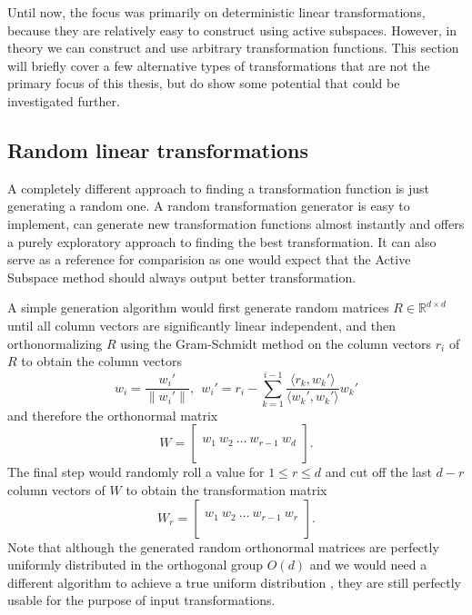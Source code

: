 \documentclass[
  a4paper,  %
  twoside,  %
  bibliography=totoc,
  headsepline,
  cleardoublepage=empty,
  parskip=half,
  draft=false
]{scrbook}
\begin{document}
Until now, the focus was primarily on deterministic linear transformations, because they are relatively easy to construct using active subspaces.
However, in theory we can construct and use arbitrary transformation functions.
This section will briefly cover a few alternative types of transformations that are not the primary focus of this thesis, but do show some potential that could be investigated further.

\subsection{Random linear transformations}
\label{sec:rt}

A completely different approach to finding a transformation function is just generating a random one.
A random transformation generator is easy to implement, can generate new transformation functions almost instantly and offers a purely exploratory approach to finding the best transformation.
It can also serve as a reference for comparision as one would expect that the Active Subspace method should always output better transformation.

A simple generation algorithm would first generate random matrices $R \in \mathds{R}^{d \times d}$ until all column vectors are significantly linear independent, and then orthonormalizing $R$ using the Gram-Schmidt method on the column vectors $r_i$ of $R$ to obtain the column vectors
\begin{equation}
w_i=\frac{w_i'}{\| w_i' \|},~~ w_i'=r_i - \sum_{k=1}^{i-1} \frac{\langle r_k,  w_k' \rangle}{\langle w_k', w_k' \rangle} w_k'
\end{equation}
and therefore the orthonormal matrix
\begin{equation}
W = \begin{bmatrix}
  \\
    w_1 ~ w_2 ~ \dots ~ w_{r-1} ~ w_d\\
    \\
  \end{bmatrix}.
\end{equation}
The final step would randomly roll a value for $1 \leq r \leq d$ and cut off the last $d-r$ column vectors of $W$ to obtain the transformation matrix
\begin{equation}
W_r = \begin{bmatrix}
  \\
    w_1 ~ w_2 ~ \dots ~ w_{r-1} ~ w_r\\
    \\
  \end{bmatrix}.
\end{equation}
Note that although the generated random orthonormal matrices are perfectly uniformly distributed in the orthogonal group $O(d)$ and we would need a different algorithm to achieve a true uniform distribution \cite{}, they are still perfectly usable for the purpose of input transformations.
\end{document}
